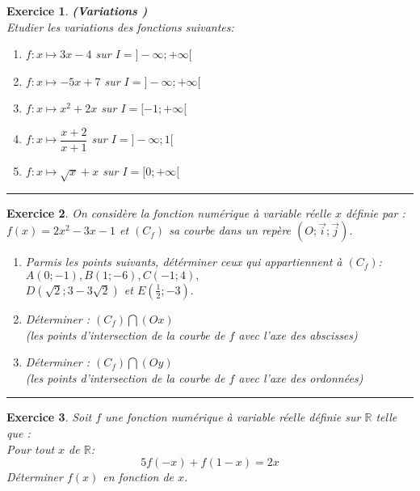 \documentclass[twocolumn,french]{article}
\newcommand{\R}{\mathbb{R}}
\theoremstyle{plain}
\newtheorem{exo}{Exercice}%
\begin{document}
\begin{exo}
\textbf{\textit{ (Variations )}}\\
Etudier les variations des  fonctions suivantes:
\\
\begin{enumerate}
\item $f:x\longmapsto 3x-4 $ sur $I=]-\infty;+\infty[$
\\
\item $f:x\longmapsto -5x+7$  sur $I=]-\infty;+\infty[$
\\
\item $f:x\longmapsto x^2+2x$  sur $I=[-1;+\infty[$
\\
\item $f:x\longmapsto \dfrac{x+2}{x+1}$  sur $I=]-\infty;1[$
\\
\item $f:x\longmapsto \sqrt{x}+x $  sur $I=[0;+\infty[$
\\
\end{enumerate}
\end{exo}
\hrule





\begin{exo}

On considère la fonction numérique à variable réelle $x$ définie par :\\
 $f(x)=2x^2-3x-1$ et $(C_f)$ sa courbe dans un repère $(O;\vec{i};\vec{j})$.
 \begin{enumerate}
 \item
 Parmis les points suivants, détérminer ceux qui appartiennent à $(C_f)$:  $A(0;-1),B(1;-6),C(-1;4),$ \\
 $D(\sqrt{2};3-3\sqrt{2})$ et $E(\frac{1}{2};-3).$
 \\
\item
Déterminer : $(C_f)\bigcap (Ox)$ \\
(les points d'intersection de la courbe de $f$ avec l'axe des abscisses)
\\
\item
Déterminer : $(C_f)\bigcap (Oy)$ \\
(les points d'intersection de la courbe de $f$ avec l'axe des ordonnées)


 \end{enumerate}
\end{exo}
\hrule
\begin{exo} 
Soit $f$ une fonction numérique à variable réelle  définie sur $\R$ telle que :\\
Pour tout $x$ de $\R$:
$$ 5f(-x)+f(1-x)=2x$$
Déterminer $f(x)$ en fonction de $x$.
\end{exo}
\end{document}
